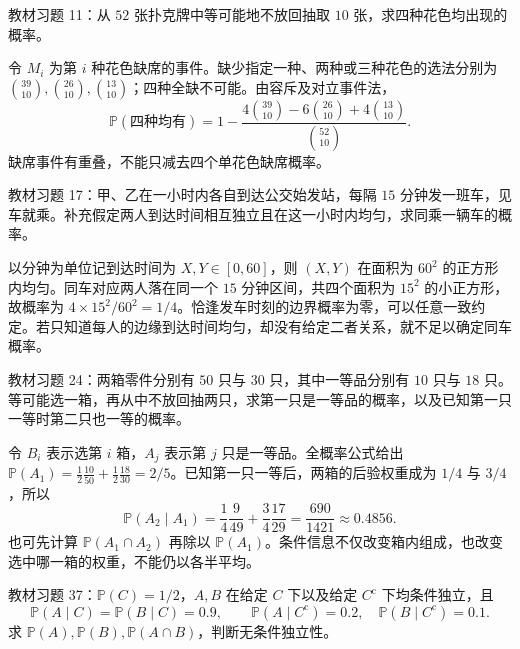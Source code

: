 \begin{example}
\label{ex:study-exercise-four-suits}
教材习题 11：从 $52$ 张扑克牌中等可能地不放回抽取 $10$ 张，求四种花色均出现的概率。
\end{example}

\begin{solve}
令 $M_i$ 为第 $i$ 种花色缺席的事件。缺少指定一种、两种或三种花色的选法分别为 $\binom{39}{10},\binom{26}{10},\binom{13}{10}$；四种全缺不可能。由容斥及对立事件法，
\[
 \mathbb P(\text{四种均有})
 =1-\frac{4\binom{39}{10}-6\binom{26}{10}+4\binom{13}{10}}
 {\binom{52}{10}}.
\]
缺席事件有重叠，不能只减去四个单花色缺席概率。
\end{solve}

\begin{example}
\label{ex:study-exercise-same-bus}
教材习题 17：甲、乙在一小时内各自到达公交始发站，每隔 $15$ 分钟发一班车，见车就乘。补充假定两人到达时间相互独立且在这一小时内均匀，求同乘一辆车的概率。
\end{example}

\begin{solve}
以分钟为单位记到达时间为 $X,Y\in[0,60]$，则 $(X,Y)$ 在面积为 $60^2$ 的正方形内均匀。同车对应两人落在同一个 $15$ 分钟区间，共四个面积为 $15^2$ 的小正方形，故概率为 $4\times15^2/60^2=1/4$。恰逢发车时刻的边界概率为零，可以任意一致约定。若只知道每人的边缘到达时间均匀，却没有给定二者关系，就不足以确定同车概率。
\end{solve}

\begin{example}
\label{ex:study-exercise-two-boxes}
教材习题 24：两箱零件分别有 $50$ 只与 $30$ 只，其中一等品分别有 $10$ 只与 $18$ 只。等可能选一箱，再从中不放回抽两只，求第一只是一等品的概率，以及已知第一只一等时第二只也一等的概率。
\end{example}

\begin{solve}
令 $B_i$ 表示选第 $i$ 箱，$A_j$ 表示第 $j$ 只是一等品。全概率公式给出 $\mathbb P(A_1)=\tfrac12\tfrac{10}{50}+\tfrac12\tfrac{18}{30}=2/5$。已知第一只一等后，两箱的后验权重成为 $1/4$ 与 $3/4$，所以
\[
 \mathbb P(A_2\mid A_1)
 =\frac14\frac9{49}+\frac34\frac{17}{29}
 =\frac{690}{1421}\approx0.4856.
\]
也可先计算 $\mathbb P(A_1\cap A_2)$ 再除以 $\mathbb P(A_1)$。条件信息不仅改变箱内组成，也改变选中哪一箱的权重，不能仍以各半平均。
\end{solve}

\begin{example}
\label{ex:study-exercise-conditional-independence}
教材习题 37：$\mathbb P(C)=1/2$，$A,B$ 在给定 $C$ 下以及给定 $C^{\mathrm c}$ 下均条件独立，且
\[
 \mathbb P(A\mid C)=\mathbb P(B\mid C)=0.9,\qquad
 \mathbb P(A\mid C^{\mathrm c})=0.2,\quad
 \mathbb P(B\mid C^{\mathrm c})=0.1.
\]
求 $\mathbb P(A),\mathbb P(B),\mathbb P(A\cap B)$，判断无条件独立性。
\end{example}

